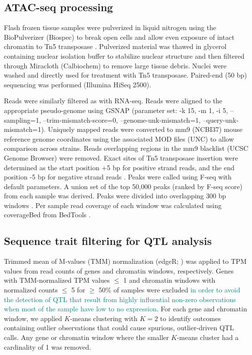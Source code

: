 \documentclass[10pt,letterpaper]{article}
\newcommand{\GKinline}[1]{\textcolor{teal}{#1}}
\begin{document}
\subsection*{ATAC-seq processing}

Flash frozen tissue samples were pulverized in liquid nitrogen using the BioPulverizer (Biospec) to break open cells and allow even exposure of intact chromatin to Tn5 transposase \cite{Buenrostro2015}. Pulverized material was thawed in glycerol containing nuclear isolation buffer to stabilize nuclear structure and then filtered through Miracloth (Calbiochem) to remove large tissue debris. Nuclei were washed and directly used for treatment with Tn5 transposase. Paired-end (50 bp) sequencing was performed (Illumina HiSeq 2500).

Reads were similarly filtered as with RNA-seq. Reads were aligned to the appropriate pseudo-genome using GSNAP (parameter set: -k 15, -m 1, -i 5, –sampling=1, –trim-mismatch-score=0, –genome-unk-mismatch=1, –query-unk-mismatch=1). Uniquely mapped reads were converted to mm9 (NCBI37) mouse reference genome coordinates using the associated MOD files (UNC) to allow comparison across strains. Reads overlapping regions in the mm9 blacklist (UCSC Genome Browser) were removed. Exact sites of Tn5 transposase insertion were determined as the start position +5 bp for positive strand reads, and the end position -5 bp for negative strand reads \cite{Buenrostro2013}. Peaks were called using F-seq with default parameters. A union set of the top 50,000 peaks (ranked by F-seq score) from each sample was derived. Peaks were divided into overlapping 300 bp windows \cite{Shibata2012}. Per sample read coverage of each window was calculated using coverageBed from BedTools \cite{Quinlan2010}.

\subsection*{Sequence trait filtering for QTL analysis}

Trimmed mean of M-values (TMM) normalization (edgeR; \cite{edgeR}) was applied to TPM values from read counts of genes and chromatin windows, respectively. Genes with TMM-normalized TPM values $\leq$ 1 and chromatin windows with normalized counts $\leq$ 5 for $\geq$ 50\% of samples were excluded \cite{Chick2016} \GKinline{in order to avoid the detection of QTL that result from highly influential non-zero observations when most of the sample have low to no expression}. For each gene and chromatin window, we applied $K$-means clustering with $K=2$ to identify outcomes containing outlier observations that could cause spurious, outlier-driven QTL calls. Any gene or chromatin window where the smaller $K$-means cluster had a cardinality of 1 was removed.
\end{document}
